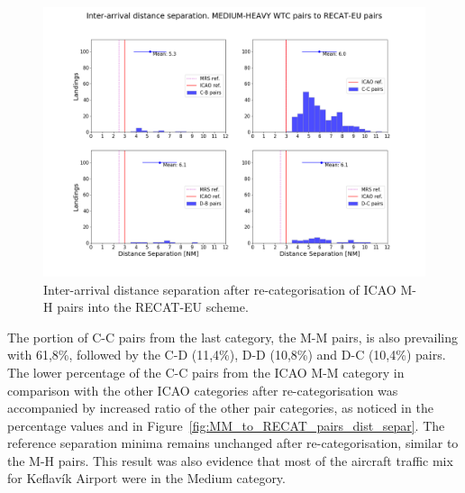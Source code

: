 \begin{figure}[h]
    \centering
    \includegraphics[width=1\textwidth]{graphics/fig_MH_to_RECAT_pairs_dist_separ.png}
    \caption[Inter-arrival distance separation of ICAO M-H pairs into the RECAT-EU scheme]{Inter-arrival distance separation after re-categorisation of ICAO M-H pairs into the RECAT-EU scheme.}
    \label{fig:MH_to_RECAT_pairs_dist_separ}
\end{figure}

The portion of C-C pairs from the last category, the M-M pairs, is also prevailing with 61,8\%, followed by the C-D (11,4\%), D-D (10,8\%) and D-C (10,4\%) pairs. The lower percentage of the C-C pairs from the ICAO M-M category in comparison with the other ICAO categories after re-categorisation was accompanied by increased ratio of the other pair categories, as noticed in the percentage values and in Figure~\ref{fig:MM_to_RECAT_pairs_dist_separ}. The reference separation minima remains unchanged after re-categorisation, similar to the M-H pairs. This result was also evidence that most of the aircraft traffic mix for Keflavík Airport were in the Medium category.

